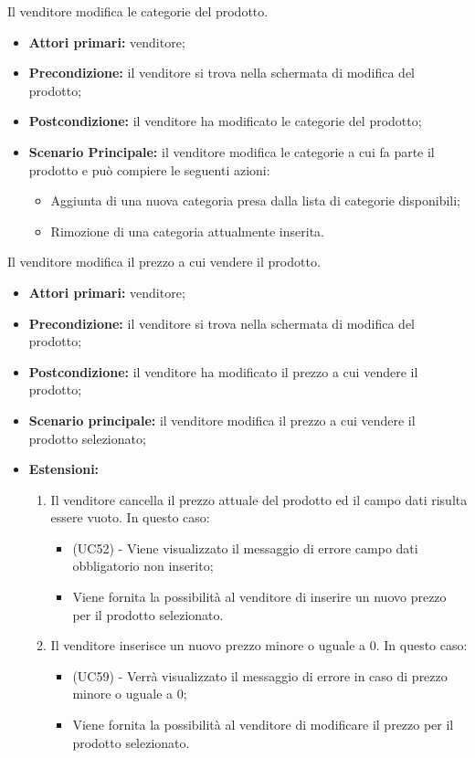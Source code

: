Il venditore modifica le categorie del prodotto.
\begin{itemize}
    \item \textbf{Attori primari:} venditore;
    \item \textbf{Precondizione:} il venditore si trova nella schermata di modifica del prodotto;
    \item \textbf{Postcondizione:} il venditore ha modificato le categorie del prodotto;
    \item \textbf{Scenario Principale:} il venditore modifica le categorie a cui fa parte il prodotto e può compiere le seguenti azioni:
    \begin{itemize}
        \item Aggiunta di una nuova categoria presa dalla lista di categorie disponibili;
        \item Rimozione di una categoria attualmente inserita.
    \end{itemize}
\end{itemize}

Il venditore modifica il prezzo a cui vendere il prodotto.
\begin{itemize}
    \item \textbf{Attori primari:} venditore;
    \item \textbf{Precondizione:} il venditore si trova nella schermata di modifica del prodotto;
    \item \textbf{Postcondizione:} il venditore ha modificato il prezzo a cui vendere il prodotto;
    \item \textbf{Scenario principale:} il venditore modifica il prezzo a cui vendere il prodotto selezionato;
    \item \textbf{Estensioni:}
    \begin{enumerate}[label=\lett]
    	\item Il venditore cancella il prezzo attuale del prodotto ed il campo dati risulta essere vuoto. In questo caso:
    	\begin{itemize}
    		\item (UC52) - Viene visualizzato il messaggio di errore campo dati obbligatorio non inserito;
    		\item Viene fornita la possibilità al venditore di inserire un nuovo prezzo per il prodotto selezionato.
    	\end{itemize}
    	\item Il venditore inserisce un nuovo prezzo minore o uguale a 0. In questo caso:
    	\begin{itemize}
    		\item (UC59) - Verrà visualizzato il messaggio di errore in caso di prezzo minore o uguale a 0;
    		\item Viene fornita la possibilità al venditore di modificare il prezzo per il prodotto selezionato.
    	\end{itemize}
    \end{enumerate}
\end{itemize}

